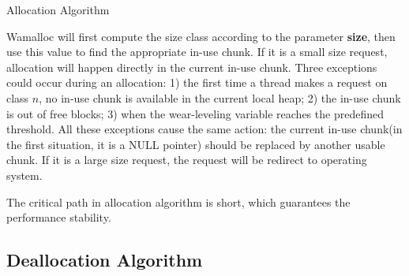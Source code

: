 \documentclass[10pt, conference, compsocconf]{IEEEtran}
\begin{document}
\begin{algorithm}
\caption{Allocation Algorithm}\label{euclid}
\end{algorithm}

Wamalloc will first compute the size class according to the parameter \textbf{size}, 
then use this value to find the appropriate in-use chunk.
If it is a small size request, allocation will happen directly in the current in-use chunk.
Three exceptions could occur during an allocation:
1) the first time a thread makes a request on class $n$, no in-use chunk is available in the current local heap;
2) the in-use chunk is out of free blocks;
3) when the wear-leveling variable reaches the predefined threshold.
All these exceptions cause the same action:
the current in-use chunk(in the first situation, it is a NULL pointer) should be replaced by another usable chunk.
If it is a large size request, the request will be redirect to operating system.

The critical path in allocation algorithm is short, which guarantees the performance stability.

\subsection{Deallocation Algorithm}
\end{document}
